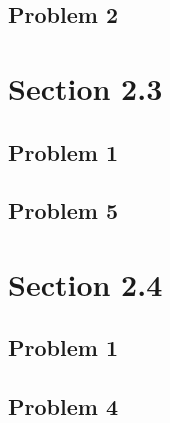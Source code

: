\documentclass{article}
\begin{document}
  \subsection{Problem 2}
\section{Section 2.3}
  \subsection{Problem 1}
  \subsection{Problem 5}
\section{Section 2.4}
  \subsection{Problem 1}
  \subsection{Problem 4}
\end{document}
